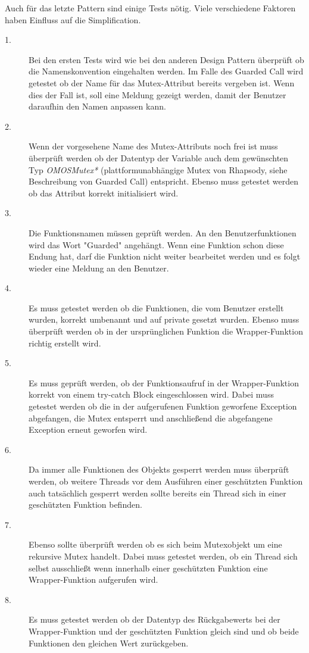 Auch für das letzte Pattern sind einige Tests nötig. Viele verschiedene Faktoren
haben Einfluss auf die Simplification.
\begin{description}

	\item[1.]
	Bei den ersten Tests wird wie bei den anderen Design Pattern überprüft ob die Namenskonvention eingehalten werden. Im Falle des Guarded Call wird getestet ob der Name für das Mutex-Attribut bereits vergeben ist. Wenn dies der Fall ist, soll eine Meldung gezeigt werden, damit der Benutzer daraufhin den Namen anpassen kann.
	
	\item[2.]
	Wenn der vorgesehene Name des Mutex-Attributs noch frei ist muss überprüft werden ob der Datentyp der Variable auch dem gewünschten Typ \textit{OMOSMutex*} (plattformunabhängige Mutex von Rhapsody, siehe Beschreibung von Guarded Call) entspricht. Ebenso muss getestet werden ob das Attribut korrekt initialisiert wird.
	
	\item[3.]
	Die Funktionsnamen müssen geprüft werden. An den Benutzerfunktionen wird das Wort "Guarded" angehängt. Wenn eine Funktion schon diese Endung hat, darf die Funktion nicht weiter bearbeitet werden und es folgt wieder eine Meldung an den Benutzer.
	
	\item[4.]
	Es muss getestet werden ob die Funktionen, die vom Benutzer erstellt wurden, korrekt umbenannt und auf private gesetzt wurden. Ebenso muss überprüft werden ob in der ursprünglichen Funktion die Wrapper-Funktion richtig erstellt wird.
	
	\item[5.]
	Es muss geprüft werden, ob der Funktionsaufruf in der Wrapper-Funktion korrekt von einem try-catch Block eingeschlossen wird. Dabei muss getestet werden ob die in der aufgerufenen Funktion geworfene Exception abgefangen, die Mutex entsperrt und anschließend die abgefangene Exception erneut geworfen wird.
	
	\item[6.]
	Da immer alle Funktionen des Objekts gesperrt werden muss überprüft werden, ob weitere Threads vor dem Ausführen einer geschützten Funktion auch tatsächlich gesperrt werden sollte bereits ein Thread sich in einer geschützten Funktion befinden.
	
	\item[7.]
	Ebenso sollte überprüft werden ob es sich beim Mutexobjekt um eine rekursive Mutex handelt. Dabei muss getestet werden, ob ein Thread sich selbst ausschließt wenn innerhalb einer geschützten Funktion eine Wrapper-Funktion aufgerufen wird.
	
	\item[8.]
	Es muss getestet werden ob der Datentyp des Rückgabewerts bei der Wrapper-Funktion und der geschützten Funktion gleich sind und ob beide Funktionen den gleichen Wert zurückgeben.
	
	
\end{description}
